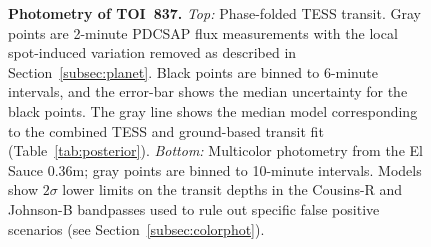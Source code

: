\documentclass[12pt,twocolumn,tighten]{aastex63}
\newcommand{\tn}{TOI~837} %
\begin{document}
\begin{figure}[!t]
	\begin{center}
		\leavevmode
		
		\vspace{-0.6cm}
	\end{center}
	\vspace{-0.7cm}
  \caption{
    {\bf Photometry of \tn.} {\it Top:}
    Phase-folded TESS transit. Gray points are 2-minute PDCSAP flux
    measurements with the local spot-induced variation removed as
    described in Section~\ref{subsec:planet}.  Black points are binned
    to 6-minute intervals, and the error-bar shows the median
    uncertainty for the black points.  The gray line shows the median
    model corresponding to the combined TESS and ground-based transit
    fit (Table~\ref{tab:posterior}).  {\it Bottom:} Multicolor
    photometry from the El Sauce 0.36m; gray points are binned to
    10-minute intervals.  Models show $2\sigma$ lower limits on the
    transit depths in the Cousins-R and Johnson-B bandpasses used to
    rule out specific false positive scenarios (see
    Section~\ref{subsec:colorphot}).
    \label{fig:jointphot}
	}
\end{figure}
\end{document}
